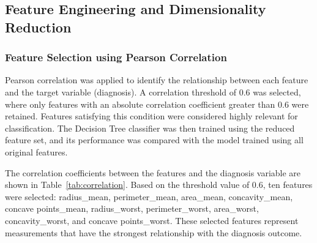 \documentclass[a4paper,12pt]{article}
\begin{document}
\subsection{Feature Engineering and Dimensionality Reduction}
\subsubsection{Feature Selection using Pearson Correlation}

Pearson correlation was applied to identify the relationship between each feature and the target variable (diagnosis). A correlation threshold of 0.6 was selected, where only features with an absolute correlation coefficient greater than 0.6 were retained. Features satisfying this condition were considered highly relevant for classification. The Decision Tree classifier was then trained using the reduced feature set, and its performance was compared with the model trained using all original features.

The correlation coefficients between the features and the diagnosis variable are shown in Table~\ref{tab:correlation}. Based on the threshold value of 0.6, ten features were selected: radius\_mean, perimeter\_mean, area\_mean, concavity\_mean, concave points\_mean, radius\_worst, perimeter\_worst, area\_worst, concavity\_worst, and concave points\_worst. These selected features represent measurements that have the strongest relationship with the diagnosis outcome.
\end{document}
